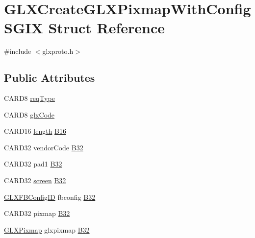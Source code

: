 \hypertarget{struct_g_l_x_create_g_l_x_pixmap_with_config_s_g_i_x}{}\section{G\+L\+X\+Create\+G\+L\+X\+Pixmap\+With\+Config\+S\+G\+IX Struct Reference}
\label{struct_g_l_x_create_g_l_x_pixmap_with_config_s_g_i_x}


{\ttfamily \#include $<$glxproto.\+h$>$}

\subsection*{Public Attributes}
\begin{DoxyCompactItemize}
\item 
C\+A\+R\+D8 \hyperlink{struct_g_l_x_create_g_l_x_pixmap_with_config_s_g_i_x_a0bd67946779a7fb64d4eb8ea12086ea6}{req\+Type}
\item 
C\+A\+R\+D8 \hyperlink{struct_g_l_x_create_g_l_x_pixmap_with_config_s_g_i_x_ae972b96fa92ce579b49dc1a80866a642}{glx\+Code}
\item 
C\+A\+R\+D16 \hyperlink{glcorearb_8h_ab9c919755bde3b34349e23a32b4e0fa7}{length} \hyperlink{struct_g_l_x_create_g_l_x_pixmap_with_config_s_g_i_x_af20418277b752210d661cd0bab18df44}{B16}
\item 
C\+A\+R\+D32 vendor\+Code \hyperlink{struct_g_l_x_create_g_l_x_pixmap_with_config_s_g_i_x_a6950cc86c70eeb767b7943671ed9e570}{B32}
\item 
C\+A\+R\+D32 pad1 \hyperlink{struct_g_l_x_create_g_l_x_pixmap_with_config_s_g_i_x_a30785870efe5d50b41e27556eb337927}{B32}
\item 
C\+A\+R\+D32 \hyperlink{cad_8h_ae04e09e4e3831bfc1632c509ae37dcec}{screen} \hyperlink{struct_g_l_x_create_g_l_x_pixmap_with_config_s_g_i_x_ac5a94b405114edea5bf465de9a135666}{B32}
\item 
\hyperlink{glx_8h_a38e78acefebf732d1a0da441ad1de05f}{G\+L\+X\+F\+B\+Config\+ID} fbconfig \hyperlink{struct_g_l_x_create_g_l_x_pixmap_with_config_s_g_i_x_abc2b9c822d03a916c48ac8adf819359b}{B32}
\item 
C\+A\+R\+D32 pixmap \hyperlink{struct_g_l_x_create_g_l_x_pixmap_with_config_s_g_i_x_ae81f17b2c1325fa730c5cb657dc94f5c}{B32}
\item 
\hyperlink{glx_8h_a6577d581069de43ebaac50c78dbccbd0}{G\+L\+X\+Pixmap} glxpixmap \hyperlink{struct_g_l_x_create_g_l_x_pixmap_with_config_s_g_i_x_ac2baca2d37e0522b500f5f3c682a2386}{B32}
\end{DoxyCompactItemize}


